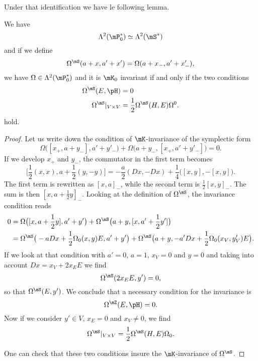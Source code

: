 Under that identification we have le following lemma.
\begin{lemma}
	We have
	\begin{equation}
		\Lambda^2(\mP_0^*)\simeq\Lambda^2(\mS^*)
	\end{equation}
	and if we define
	\begin{equation}
		\Omega^{\mS}(a+x,a'+x')=\Omega(a+x_-,a'+x'_-),
	\end{equation}
	we have $\Omega\in\Lambda^2(\mP_0^*)$ and it is $\mK_0$ invariant if and only if the two conditions
	\begin{equation}
		\begin{aligned}[]
			\Omega^{\mS}(E,\pH)&=0\\
			\Omega^{\mS}|_{V\times V}&=\frac{ 1 }{2}\Omega^{\mS}(H,E)\Omega^0.
		\end{aligned}
	\end{equation}
	hold.
\end{lemma}

\begin{proof}
	Let us write down the condition of $\mK$-invariance of the symplectic form
	\begin{equation}
		\Omega\big( [x_+,a+y_-],a'+y'_- \big)+\Omega\big( a+y_-,[x_+,a'+y'_-] \big)=0.
	\end{equation}
	If we develop $x_+$ and $y_-$, the commutator in the first term becomes
	\begin{equation}
		\big[ \frac{ 1 }{2}(x,x),a+\frac{ 1 }{2}(y,-y) \big]=-\frac{ a }{2}(Dx,-Dx)+\frac{1}{ 4 }\big( [x,y],-[x,y] \big).
	\end{equation}
	The first term is rewritten as $[x,a]_-$, while the second term is $\frac{ 1 }{2}[x,y]_-$. The sum is then $[x,a+\frac{ 1 }{2}y]_-$. Looking at the definition of $\Omega^{\mS}$, the invariance condition reads
	\begin{equation}
		\begin{aligned}[]
			0&=\Omega\big( [x,a+\frac{ 1 }{2}y],a'+y' \big)+\Omega^{\mS}\big( a+y,[x,a'+\frac{ 1 }{2}y'] \big)\\
			&=\Omega^{\mS}\big( -a Dx+\frac{ 1 }{2}\Omega_0(x,y)E,a'+y' \big)+\Omega^{\mS}\big( a+y,-a'Dx+\frac{ 1 }{2}\Omega_0(x_V,y_V')E \big).
		\end{aligned}
	\end{equation}
	If we look at that condition with $a'=0$, $a=1$, $x_V=0$ and $y=0$ and taking into account $Dx=x_V+2x_EE$ we find
	\begin{equation}
		\Omega^{\mS}(2x_EE,y')=0,
	\end{equation}
	so that $\Omega^{\mS}(E,y')$. We conclude that a necessary condition for the invariance is
	\begin{equation}
		\Omega^{\mZ}(E,\pH)=0.
	\end{equation}
	Now if we consider $y'\in V$, $x_E=0$ and $x_V\neq 0$, we find
	\begin{equation}
		\Omega^{\mS}|_{V\times V}=\frac{ 1 }{2}\Omega^{\mS}(H,E)\Omega_0.
	\end{equation}

	One can check that these two conditions insure the $\mK$-invariance of $\Omega^{\mS}$.
\end{proof}


